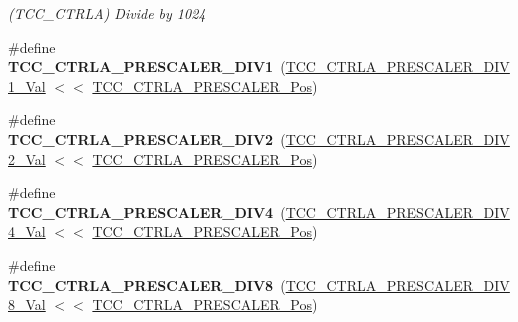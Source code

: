 \begin{DoxyCompactItemize}
\begin{DoxyCompactList}\small\item\em (T\+C\+C\+\_\+\+C\+T\+R\+L\+A) Divide by 1024 \end{DoxyCompactList}\item 
\hypertarget{group___s_a_m_l21___t_c_c_ga3cb1f24271e2e7e783fc3e0388071df2}{}\#define {\bfseries T\+C\+C\+\_\+\+C\+T\+R\+L\+A\+\_\+\+P\+R\+E\+S\+C\+A\+L\+E\+R\+\_\+\+D\+I\+V1}~(\hyperlink{group___s_a_m_l21___t_c_c_gadd276c0ff8b221d35f6a2c235a6e8df3}{T\+C\+C\+\_\+\+C\+T\+R\+L\+A\+\_\+\+P\+R\+E\+S\+C\+A\+L\+E\+R\+\_\+\+D\+I\+V1\+\_\+\+Val}  $<$$<$ \hyperlink{group___s_a_m_l21___t_c_c_ga32250640d272bee4d7ef7ef16fd8d97d}{T\+C\+C\+\_\+\+C\+T\+R\+L\+A\+\_\+\+P\+R\+E\+S\+C\+A\+L\+E\+R\+\_\+\+Pos})\label{group___s_a_m_l21___t_c_c_ga3cb1f24271e2e7e783fc3e0388071df2}

\item 
\hypertarget{group___s_a_m_l21___t_c_c_ga41f812b2ba6e1ed80dae748e74a1fe60}{}\#define {\bfseries T\+C\+C\+\_\+\+C\+T\+R\+L\+A\+\_\+\+P\+R\+E\+S\+C\+A\+L\+E\+R\+\_\+\+D\+I\+V2}~(\hyperlink{group___s_a_m_l21___t_c_c_ga74ebf13d5435775ec5c6d54959e19462}{T\+C\+C\+\_\+\+C\+T\+R\+L\+A\+\_\+\+P\+R\+E\+S\+C\+A\+L\+E\+R\+\_\+\+D\+I\+V2\+\_\+\+Val}  $<$$<$ \hyperlink{group___s_a_m_l21___t_c_c_ga32250640d272bee4d7ef7ef16fd8d97d}{T\+C\+C\+\_\+\+C\+T\+R\+L\+A\+\_\+\+P\+R\+E\+S\+C\+A\+L\+E\+R\+\_\+\+Pos})\label{group___s_a_m_l21___t_c_c_ga41f812b2ba6e1ed80dae748e74a1fe60}

\item 
\hypertarget{group___s_a_m_l21___t_c_c_gacc3b81570e97c15d73c1ad84fc871680}{}\#define {\bfseries T\+C\+C\+\_\+\+C\+T\+R\+L\+A\+\_\+\+P\+R\+E\+S\+C\+A\+L\+E\+R\+\_\+\+D\+I\+V4}~(\hyperlink{group___s_a_m_l21___t_c_c_ga6c66d0a745eefa138dbfc42123c8c8c6}{T\+C\+C\+\_\+\+C\+T\+R\+L\+A\+\_\+\+P\+R\+E\+S\+C\+A\+L\+E\+R\+\_\+\+D\+I\+V4\+\_\+\+Val}  $<$$<$ \hyperlink{group___s_a_m_l21___t_c_c_ga32250640d272bee4d7ef7ef16fd8d97d}{T\+C\+C\+\_\+\+C\+T\+R\+L\+A\+\_\+\+P\+R\+E\+S\+C\+A\+L\+E\+R\+\_\+\+Pos})\label{group___s_a_m_l21___t_c_c_gacc3b81570e97c15d73c1ad84fc871680}

\item 
\hypertarget{group___s_a_m_l21___t_c_c_ga39793f0ea9b7fa6811c9c7465d0e86e6}{}\#define {\bfseries T\+C\+C\+\_\+\+C\+T\+R\+L\+A\+\_\+\+P\+R\+E\+S\+C\+A\+L\+E\+R\+\_\+\+D\+I\+V8}~(\hyperlink{group___s_a_m_l21___t_c_c_ga43505437cfab38c083db27c1a96508e1}{T\+C\+C\+\_\+\+C\+T\+R\+L\+A\+\_\+\+P\+R\+E\+S\+C\+A\+L\+E\+R\+\_\+\+D\+I\+V8\+\_\+\+Val}  $<$$<$ \hyperlink{group___s_a_m_l21___t_c_c_ga32250640d272bee4d7ef7ef16fd8d97d}{T\+C\+C\+\_\+\+C\+T\+R\+L\+A\+\_\+\+P\+R\+E\+S\+C\+A\+L\+E\+R\+\_\+\+Pos})\label{group___s_a_m_l21___t_c_c_ga39793f0ea9b7fa6811c9c7465d0e86e6}


\end{DoxyCompactItemize}
